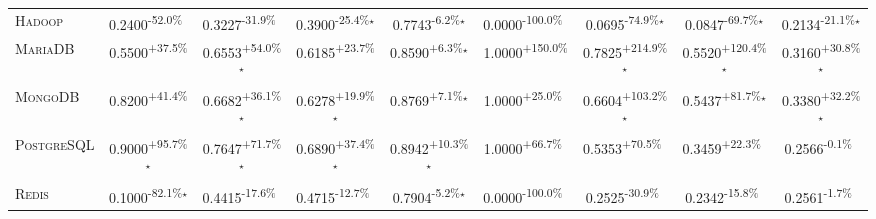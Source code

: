 \begin{table}[htbp]
\begin{tabular}{l|cccc|cccc}
\textsc{Hadoop} & \cellcolor{red!30}0.2400\textsuperscript{-52.0\%}$^{\,\,\,}$ & \cellcolor{red!30}0.3227\textsuperscript{-31.9\%}$^{\,\,\,}$ & \cellcolor{red!30}0.3900\textsuperscript{-25.4\%}$^\star$ & \cellcolor{red!30}0.7743\textsuperscript{-6.2\%}$^\star$ & \cellcolor{red!30}0.0000\textsuperscript{-100.0\%}$^{\,\,\,}$ & \cellcolor{red!30}0.0695\textsuperscript{-74.9\%}$^\star$ & \cellcolor{red!30}0.0847\textsuperscript{-69.7\%}$^\star$ & \cellcolor{red!30}0.2134\textsuperscript{-21.1\%}$^\star$ \\
\textsc{MariaDB} & \cellcolor{green!30}0.5500\textsuperscript{+37.5\%}$^{\,\,\,}$ & \cellcolor{green!30}0.6553\textsuperscript{+54.0\%}$^\star$ & \cellcolor{green!30}0.6185\textsuperscript{+23.7\%}$^{\,\,\,}$ & \cellcolor{green!30}0.8590\textsuperscript{+6.3\%}$^\star$ & \cellcolor{green!30}1.0000\textsuperscript{+150.0\%}$^{\,\,\,}$ & \cellcolor{green!30}0.7825\textsuperscript{+214.9\%}$^\star$ & \cellcolor{green!30}0.5520\textsuperscript{+120.4\%}$^\star$ & \cellcolor{green!30}0.3160\textsuperscript{+30.8\%}$^\star$ \\
\textsc{MongoDB} & \cellcolor{green!30}0.8200\textsuperscript{+41.4\%}$^{\,\,\,}$ & \cellcolor{green!30}0.6682\textsuperscript{+36.1\%}$^\star$ & \cellcolor{green!30}0.6278\textsuperscript{+19.9\%}$^\star$ & \cellcolor{green!30}0.8769\textsuperscript{+7.1\%}$^\star$ & \cellcolor{green!30}1.0000\textsuperscript{+25.0\%}$^{\,\,\,}$ & \cellcolor{green!30}0.6604\textsuperscript{+103.2\%}$^\star$ & \cellcolor{green!30}0.5437\textsuperscript{+81.7\%}$^\star$ & \cellcolor{green!30}0.3380\textsuperscript{+32.2\%}$^\star$ \\
\textsc{PostgreSQL} & \cellcolor{green!30}0.9000\textsuperscript{+95.7\%}$^\star$ & \cellcolor{green!30}0.7647\textsuperscript{+71.7\%}$^\star$ & \cellcolor{green!30}0.6890\textsuperscript{+37.4\%}$^\star$ & \cellcolor{green!30}0.8942\textsuperscript{+10.3\%}$^\star$ & \cellcolor{green!30}1.0000\textsuperscript{+66.7\%}$^{\,\,\,}$ & \cellcolor{green!30}0.5353\textsuperscript{+70.5\%}$^{\,\,\,}$ & \cellcolor{green!30}0.3459\textsuperscript{+22.3\%}$^{\,\,\,}$ & \cellcolor{red!30}0.2566\textsuperscript{-0.1\%}$^{\,\,\,}$ \\
\textsc{Redis} & \cellcolor{red!30}0.1000\textsuperscript{-82.1\%}$^\star$ & \cellcolor{red!30}0.4415\textsuperscript{-17.6\%}$^{\,\,\,}$ & \cellcolor{red!30}0.4715\textsuperscript{-12.7\%}$^{\,\,\,}$ & \cellcolor{red!30}0.7904\textsuperscript{-5.2\%}$^\star$ & \cellcolor{red!30}0.0000\textsuperscript{-100.0\%}$^{\,\,\,}$ & \cellcolor{red!30}0.2525\textsuperscript{-30.9\%}$^{\,\,\,}$ & \cellcolor{red!30}0.2342\textsuperscript{-15.8\%}$^{\,\,\,}$ & \cellcolor{red!30}0.2561\textsuperscript{-1.7\%}$^{\,\,\,}$ \\

\end{tabular}
\end{table}
